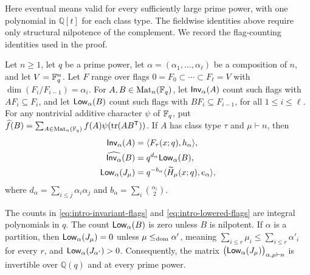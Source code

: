 Here eventual means valid for every sufficiently large prime power, with
one polynomial in $\mathbb Q[t]$ for each class type.
The fieldwise identities above require
only structural nilpotence of the complement.
{We record the flag-counting identities used in the proof.}
\begin{proposition}
\label{prop:intro-flag-system}
Let $n\geq1$, let $q$ be a prime power, let $\alpha=(\alpha_1,\ldots,
\alpha_\ell)$ be a composition of $n$, and let $V=\mathbb F_q^n$.
Let $F$ range over flags $0=F_0\subset\cdots\subset F_\ell=V$ with
$\dim(F_i/F_{i-1})=\alpha_i$. For $A,B\in\operatorname{Mat}_n(\mathbb F_q)$, let
$\mathsf{Inv}_\alpha(A)$ count {such flags} with $AF_i\subseteq F_i$,
and let $\mathsf{Low}_\alpha(B)$ count {such flags} with
$BF_i\subseteq F_{i-1}$, for all $1\leq i\leq\ell$.
{For any nontrivial additive character $\psi$ of $\mathbb F_q$,} put
$\widehat f(B)=\sum_{A\in\operatorname{Mat}_n(\mathbb F_q)}f(A)\psi(\operatorname{tr}(AB^{\mathsf T}))$.
If $A$ has class type $\tau$ and $\mu\vdash n$, then
\begin{align}
 \mathsf{Inv}_\alpha(A)&=\langle F_\tau(x;q),h_\alpha\rangle,
 \label{eq:intro-invariant-flags}\\
 \widehat{\mathsf{Inv}_\alpha}(B)&=q^{d_\alpha}\mathsf{Low}_\alpha(B),
 \label{eq:intro-flag-transform}\\
 \mathsf{Low}_\alpha(J_\mu)&=q^{-b_\alpha}
                 \langle\widetilde H_\mu(x;q),e_\alpha\rangle,
 \label{eq:intro-lowered-flags}
\end{align}
where $d_\alpha=\sum_{i\leq j}\alpha_i\alpha_j$ and
$b_\alpha=\sum_i\binom{\alpha_i}{2}$.
\end{proposition}

{The counts in
\eqref{eq:intro-invariant-flags} and \eqref{eq:intro-lowered-flags} are
integral polynomials in $q$. The count $\mathsf{Low}_\alpha(B)$ is zero
unless $B$ is nilpotent. If $\alpha$ is a partition, then
$\mathsf{Low}_\alpha(J_\mu)=0$ unless $\mu\leq_{\rm dom}\alpha'$, meaning
$\sum_{i\leq r}\mu_i\leq\sum_{i\leq r}\alpha'_i$ for every $r$, and
$\mathsf{Low}_\alpha(J_{\alpha'})>0$. Consequently, the matrix
$\bigl(\mathsf{Low}_\alpha(J_\mu)\bigr)_{\alpha,\mu\vdash n}$ is
invertible over $\mathbb Q(q)$ and at every prime power.}


